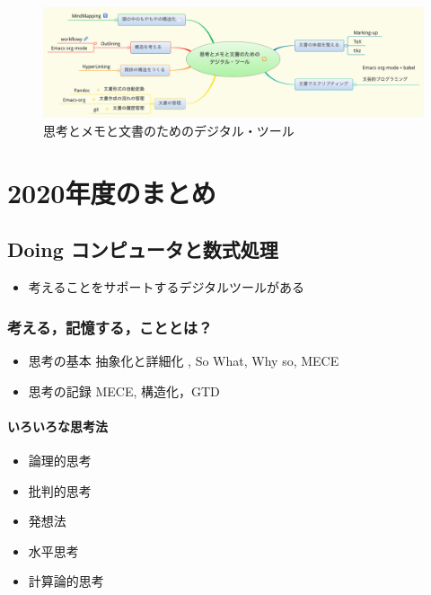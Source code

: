 \documentclass[dvipdfmx,11pat]{jarticle}
\begin{document}
\begin{figure}[htbp]
\centering
\includegraphics[width=18cm]{./map-images/05-digital_tools_for_thinking.png}
\caption{思考とメモと文書のためのデジタル・ツール}
\end{figure}


\section*{2020年度のまとめ}
\label{sec:org06c2f78}

\subsection*{{\bfseries\sffamily Doing} コンピュータと数式処理}
\label{sec:org1b128b4}
\begin{itemize}
\item 考えることをサポートするデジタルツールがある
\end{itemize}

\subsubsection*{考える，記憶する，こととは？}
\label{sec:orge43d54e}

\begin{itemize}
\item 思考の基本 抽象化と詳細化 , So What, Why so, MECE
\item 思考の記録 MECE, 構造化，GTD
\end{itemize}

\paragraph*{いろいろな思考法}
\label{sec:orgf8da2d0}
\begin{itemize}
\item 論理的思考
\item 批判的思考
\item 発想法
\item 水平思考
\item 計算論的思考
\end{itemize}
\end{document}

